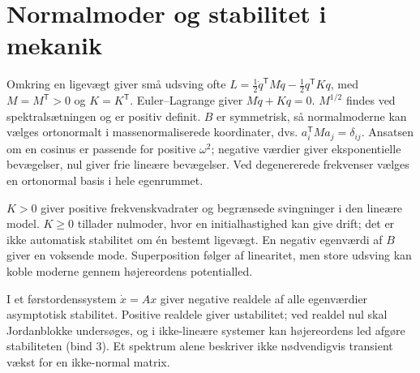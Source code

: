 \section{Normalmoder og stabilitet i mekanik}
\label{sec:normalmoder}
Omkring en ligevægt giver små udsving ofte
$L=\tfrac12\dot q^{\mathsf T}M\dot q-\tfrac12q^{\mathsf T}Kq$,
med $M=M^{\mathsf T}>0$ og $K=K^{\mathsf T}$.
Euler--Lagrange giver $M\ddot q+Kq=0$.
$M^{1/2}$ findes ved spektralsætningen og er positiv definit.
$B$ er symmetrisk, så normalmoderne kan vælges ortonormalt i
massenormaliserede koordinater, dvs. $a_i^{\mathsf T}Ma_j=\delta_{ij}$.
Ansatsen om en cosinus er passende for positive $\omega^2$;
negative værdier giver eksponentielle bevægelser, nul giver frie lineære
bevægelser. Ved degenererede frekvenser vælges en ortonormal basis i
hele egenrummet.



$K>0$ giver positive frekvenskvadrater og begrænsede svingninger i den
lineære model. $K\ge0$ tillader nulmoder, hvor en initialhastighed kan
give drift; det er ikke automatisk stabilitet om én bestemt ligevægt.
En negativ egenværdi af $B$ giver en voksende mode.
Superposition følger af linearitet, men store udsving kan koble
moderne gennem højereordens potentialled.

I et førstordenssystem $\dot x=Ax$ giver negative realdele af alle
egenværdier asymptotisk stabilitet. Positive realdele giver ustabilitet;
ved realdel nul skal Jordanblokke undersøges, og i ikke-lineære systemer
kan højereordens led afgøre stabiliteten (bind 3).
Et spektrum alene beskriver ikke nødvendigvis transient vækst for en
ikke-normal matrix.

